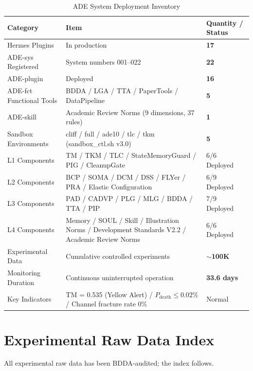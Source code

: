 \documentclass[11pt,a4paper]{article}
\begin{document}
\begin{table}[htbp]
\centering
\caption{ADE System Deployment Inventory}
\label{tab:deployment}
\begin{tabular}{p{}p{}p{}}
\hline
\textbf{Category} & \textbf{Item} & \textbf{Quantity / Status} \\
\hline
Hermes Plugins & In production & \textbf{17} \\
ADE-sys Registered & System numbers 001--022 & \textbf{22} \\
ADE-plugin & Deployed & \textbf{16} \\
ADE-fct Functional Tools & BDDA / LGA / TTA / PaperTools / DataPipeline & \textbf{5} \\
ADE-skill & Academic Review Norms (9 dimensions, 37 rules) & \textbf{1} \\
Sandbox Environments & cliff / full / ade10 / tlc / tkm (sandbox\_ctl.sh v3.0) & \textbf{5} \\
L1 Components & TM / TKM / TLC / StateMemoryGuard / PIG / CleanupGate & 6/6 Deployed \\
L2 Components & BCP / SOMA / DCM / DSS / FLYer / PRA / Elastic Configuration & 6/9 Deployed \\
L3 Components & PAD / CADVP / PLG / MLG / BDDA / TTA / PIP & 7/9 Deployed \\
L4 Components & Memory / SOUL / Skill / Illustration Norms / Development Standards V2.2 / Academic Review Norms & 6/6 Deployed \\
Experimental Data & Cumulative controlled experiments & $\sim$\textbf{100K} \\
Monitoring Duration & Continuous uninterrupted operation & \textbf{33.6 days} \\
Key Indicators & TM = 0.535 (Yellow Alert) / $P_{\text{death}} \leq 0.02\%$ / Channel fracture rate 0\% & Normal \\
\hline
\end{tabular}
\end{table}

\section{Experimental Raw Data Index}
\label{app:F}

All experimental raw data has been BDDA-audited; the index follows.
\end{document}
